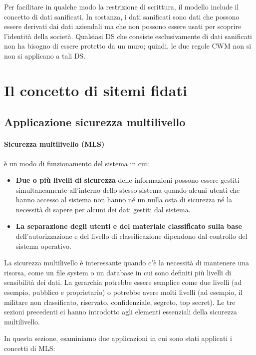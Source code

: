 \singlespacing

Per facilitare in qualche modo la restrizione di scrittura, il modello include il concetto di dati sanificati. In sostanza, i dati sanificati sono dati che possono essere derivati dai dati aziendali ma che non possono essere usati per scoprire l'identità della società. Qualsiasi DS che consiste esclusivamente di dati sanificati non ha bisogno di essere protetto da un muro; quindi, le due regole CWM non si non si applicano a tali DS.
\newpage
\section{Il concetto di sitemi fidati}
\subsection{Applicazione sicurezza multilivello}
\paragraph{Sicurezza multilivello (MLS)} è un modo di funzionamento del sistema in cui:

\begin{itemize}
    \item \textbf{Due o più livelli di sicurezza} delle informazioni possono essere gestiti simultaneamente all'interno dello stesso sistema quando alcuni utenti che hanno accesso al sistema non hanno né un nulla osta di sicurezza né la necessità di sapere per alcuni dei dati gestiti dal sistema.
    
    \item \textbf{La separazione degli utenti e del materiale classificato sulla base} dell'autorizzazione e del livello di classificazione dipendono dal controllo del sistema operativo.

\end{itemize}
La sicurezza multilivello è interessante quando c'è la necessità di mantenere una risorsa, come un file system o un database in cui sono definiti più livelli di sensibilità dei dati. La gerarchia potrebbe essere semplice come due livelli (ad esempio, pubblico e proprietario) o potrebbe avere molti livelli (ad esempio, il militare non classificato, riservato, confidenziale, segreto, top secret). Le tre sezioni precedenti ci hanno introdotto agli elementi essenziali della sicurezza multilivello. 

\singlespacing

In questa sezione, esaminiamo due applicazioni in cui sono stati applicati i concetti di MLS: 

